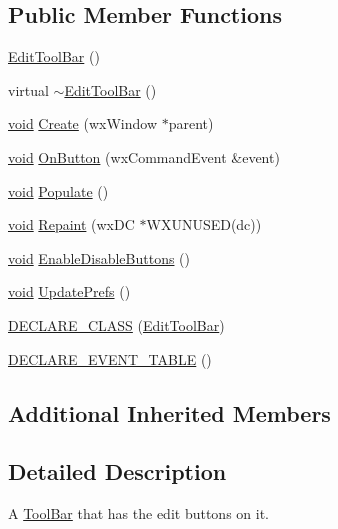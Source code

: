 \subsection*{Public Member Functions}
\begin{DoxyCompactItemize}
\item 
\hyperlink{class_edit_tool_bar_a134fdbe21ef5fc1f29b48bf07e4e65fb}{Edit\+Tool\+Bar} ()
\item 
virtual \hyperlink{class_edit_tool_bar_af1fb98be67d008c008742f70a537fc88}{$\sim$\+Edit\+Tool\+Bar} ()
\item 
\hyperlink{sound_8c_ae35f5844602719cf66324f4de2a658b3}{void} \hyperlink{class_edit_tool_bar_a4084297a47cad452c6da948791629f07}{Create} (wx\+Window $\ast$parent)
\item 
\hyperlink{sound_8c_ae35f5844602719cf66324f4de2a658b3}{void} \hyperlink{class_edit_tool_bar_a9c6ea2084303696933e07bd51ee3fa5c}{On\+Button} (wx\+Command\+Event \&event)
\item 
\hyperlink{sound_8c_ae35f5844602719cf66324f4de2a658b3}{void} \hyperlink{class_edit_tool_bar_acd6e3847dabeef68366f90fb825bd4d5}{Populate} ()
\item 
\hyperlink{sound_8c_ae35f5844602719cf66324f4de2a658b3}{void} \hyperlink{class_edit_tool_bar_a04cf87dfd63c7f4ee28f0b5a5ce1faee}{Repaint} (wx\+DC $\ast$W\+X\+U\+N\+U\+S\+ED(dc))
\item 
\hyperlink{sound_8c_ae35f5844602719cf66324f4de2a658b3}{void} \hyperlink{class_edit_tool_bar_ae979d5adf438a3da4f56058a8b08b6e0}{Enable\+Disable\+Buttons} ()
\item 
\hyperlink{sound_8c_ae35f5844602719cf66324f4de2a658b3}{void} \hyperlink{class_edit_tool_bar_a575e9c70b590d0f9b5c52fba3c4986ba}{Update\+Prefs} ()
\item 
\hyperlink{class_edit_tool_bar_ac6350330f55c2cfa9d16b84fcd516661}{D\+E\+C\+L\+A\+R\+E\+\_\+\+C\+L\+A\+SS} (\hyperlink{class_edit_tool_bar}{Edit\+Tool\+Bar})
\item 
\hyperlink{class_edit_tool_bar_a77b7b8a07a2959bd07b132584e37b6bd}{D\+E\+C\+L\+A\+R\+E\+\_\+\+E\+V\+E\+N\+T\+\_\+\+T\+A\+B\+LE} ()
\end{DoxyCompactItemize}
\subsection*{Additional Inherited Members}


\subsection{Detailed Description}
A \hyperlink{class_tool_bar}{Tool\+Bar} that has the edit buttons on it. 

